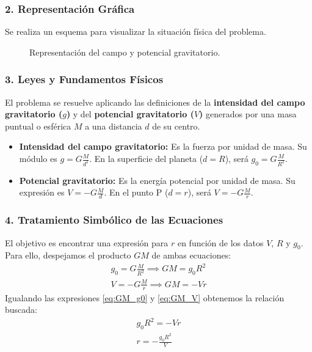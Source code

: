\subsubsection*{2. Representación Gráfica}
Se realiza un esquema para visualizar la situación física del problema.
\begin{figure}[H]
    \centering
    \caption{Representación del campo y potencial gravitatorio.}
\end{figure}

\subsubsection*{3. Leyes y Fundamentos Físicos}
El problema se resuelve aplicando las definiciones de la \textbf{intensidad del campo gravitatorio ($g$)} y del \textbf{potencial gravitatorio ($V$)} generados por una masa puntual o esférica $M$ a una distancia $d$ de su centro.
\begin{itemize}
    \item \textbf{Intensidad del campo gravitatorio:} Es la fuerza por unidad de masa. Su módulo es $g = G \frac{M}{d^2}$. En la superficie del planeta ($d=R$), será $g_0 = G \frac{M}{R^2}$.
    \item \textbf{Potencial gravitatorio:} Es la energía potencial por unidad de masa. Su expresión es $V = -G \frac{M}{d}$. En el punto P ($d=r$), será $V = -G \frac{M}{r}$.
\end{itemize}

\subsubsection*{4. Tratamiento Simbólico de las Ecuaciones}
El objetivo es encontrar una expresión para $r$ en función de los datos $V$, $R$ y $g_0$. Para ello, despejamos el producto $GM$ de ambas ecuaciones:
\begin{gather}
    g_0 = G \frac{M}{R^2} \implies GM = g_0 R^2 \label{eq:GM_g0} \\
    V = -G \frac{M}{r} \implies GM = -V r \label{eq:GM_V}
\end{gather}
Igualando las expresiones \eqref{eq:GM_g0} y \eqref{eq:GM_V} obtenemos la relación buscada:
\begin{gather}
    g_0 R^2 = -V r \nonumber \\
    r = -\frac{g_0 R^2}{V}
\end{gather}

